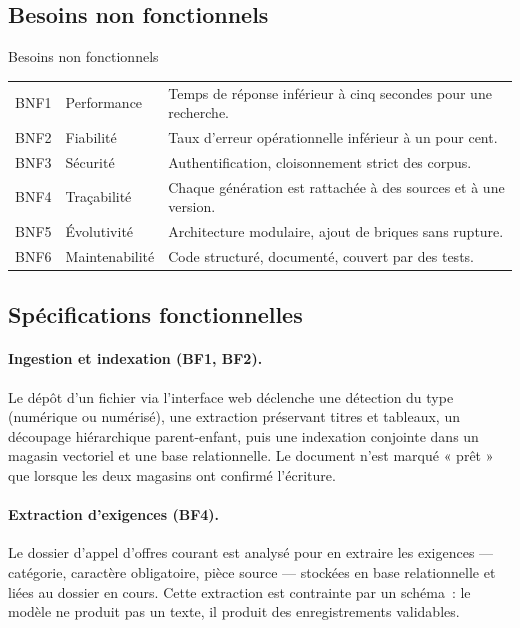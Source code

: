\subsection{Besoins non fonctionnels}

\begin{btptable}{Besoins non fonctionnels}
\label{tab:besoins-nf}
\begin{tabularx}{\linewidth}{@{}C{1.3cm} L{2.8cm} Y@{}}
\toprule
{}
 &  &  \\
\midrule
BNF1 & Performance     & Temps de réponse inférieur à cinq secondes pour une recherche. \\
BNF2 & Fiabilité       & Taux d'erreur opérationnelle inférieur à un pour cent. \\
BNF3 & Sécurité        & Authentification, cloisonnement strict des corpus. \\
BNF4 & Traçabilité     & Chaque génération est rattachée à des sources et à une version. \\
BNF5 & Évolutivité     & Architecture modulaire, ajout de briques sans rupture. \\
BNF6 & Maintenabilité  & Code structuré, documenté, couvert par des tests. \\
\bottomrule
\end{tabularx}
\end{btptable}

\subsection{Spécifications fonctionnelles}

\paragraph{Ingestion et indexation (BF1, BF2).}
Le dépôt d'un fichier via l'interface web déclenche une détection du type
(numérique ou numérisé), une extraction préservant titres et tableaux, un
découpage hiérarchique parent-enfant, puis une indexation conjointe dans
un magasin vectoriel et une base relationnelle. Le document n'est marqué
« prêt » que lorsque les deux magasins ont confirmé l'écriture.

\paragraph{Extraction d'exigences (BF4).}
Le dossier d'appel d'offres courant est analysé pour en extraire les
exigences --- catégorie, caractère obligatoire, pièce source --- stockées
en base relationnelle et liées au dossier en cours. Cette extraction est
contrainte par un schéma~: le modèle ne produit pas un texte, il produit
des enregistrements validables.

